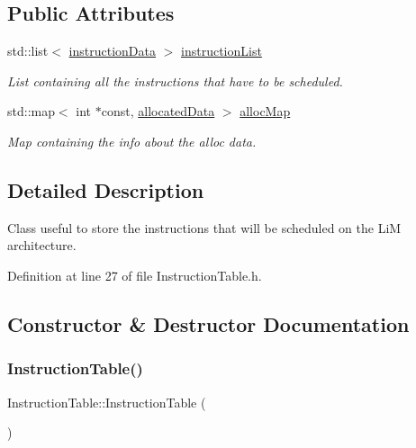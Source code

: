 \subsection*{Public Attributes}
\begin{DoxyCompactItemize}
\item 
std\+::list$<$ \hyperlink{structoctantis_1_1InstructionTable_1_1instructionData}{instruction\+Data} $>$ \hyperlink{classoctantis_1_1InstructionTable_a3b03228ed9a4db4430563ff61fcc6c6e}{instruction\+List}
\begin{DoxyCompactList}\small\item\em List containing all the instructions that have to be scheduled. \end{DoxyCompactList}\item 
std\+::map$<$ int $\ast$const, \hyperlink{structoctantis_1_1InstructionTable_1_1allocatedData}{allocated\+Data} $>$ \hyperlink{classoctantis_1_1InstructionTable_a3a31a38f9f92b0ecd72c63698fe02808}{alloc\+Map}
\begin{DoxyCompactList}\small\item\em Map containing the info about the alloc data. \end{DoxyCompactList}\end{DoxyCompactItemize}


\subsection{Detailed Description}
Class useful to store the instructions that will be scheduled on the LiM architecture. 

Definition at line 27 of file Instruction\+Table.\+h.



\subsection{Constructor \& Destructor Documentation}
\mbox{\label{classoctantis_1_1InstructionTable_a59d38f5661dff5c938a8ee4e85213f27}} 
\subsubsection{\texorpdfstring{Instruction\+Table()}{InstructionTable()}}
{\footnotesize\ttfamily Instruction\+Table\+::\+Instruction\+Table (\begin{DoxyParamCaption}{ }\end{DoxyParamCaption})}



